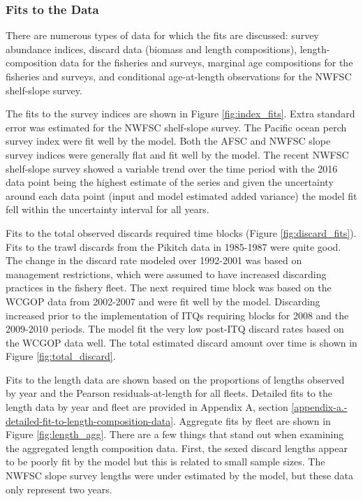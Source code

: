 \documentclass[12pt,]{article}
\begin{document}
\subsubsection{Fits to the Data}\label{fits-to-the-data}

There are numerous types of data for which the fits are discussed:
survey abundance indices, discard data (biomass and length
compositions), length-composition data for the fisheries and surveys,
marginal age compositions for the fisheries and surveys, and conditional
age-at-length observations for the NWFSC shelf-slope survey.

The fits to the survey indices are shown in Figure \ref{fig:index_fits}.
Extra standard error was estimated for the NWFSC shelf-slope survey. The
Pacific ocean perch survey index were fit well by the model. Both the
AFSC and NWFSC slope survey indices were generally flat and fit well by
the model. The recent NWFSC shelf-slope survey showed a variable trend
over the time period with the 2016 data point being the highest estimate
of the series and given the uncertainty around each data point (input
and model estimated added variance) the model fit fell within the
uncertainty interval for all years.

Fits to the total observed discards required time blocks (Figure
\ref{fig:discard_fits}). Fits to the trawl discards from the Pikitch
data in 1985-1987 were quite good. The change in the discard rate
modeled over 1992-2001 was based on management restrictions, which were
assumed to have increased discarding practices in the fishery fleet. The
next required time block was based on the WCGOP data from 2002-2007 and
were fit well by the model. Discarding increased prior to the
implementation of ITQs requiring blocks for 2008 and the 2009-2010
periods. The model fit the very low post-ITQ discard rates based on the
WCGOP data well. The total estimated discard amount over time is shown
in Figure \ref{fig:total_discard}.

Fits to the length data are shown based on the proportions of lengths
observed by year and the Pearson residuals-at-length for all fleets.
Detailed fits to the length data by year and fleet are provided in
Appendix A, section
\ref{appendix-a.-detailed-fit-to-length-composition-data}. Aggregate
fits by fleet are shown in Figure \ref{fig:length_agg}. There are a few
things that stand out when examining the aggregated length composition
data. First, the sexed discard lengths appear to be poorly fit by the
model but this is related to small sample sizes. The NWFSC slope survey
lengths were under estimated by the model, but these data only represent
two years.
\end{document}
